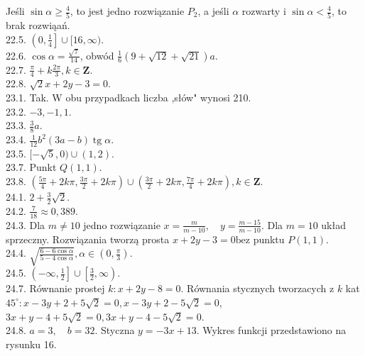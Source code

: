\documentclass[10pt]{article}
\begin{document}
Jeśli $\sin \alpha \geq \frac{4}{5}$, to jest jedno rozwiązanie $P_{2}$, a jeśli $\alpha$ rozwarty i $\sin \alpha<\frac{4}{5}$, to brak rozwiąań.\\
22.5. $\left(0, \frac{1}{4}\right] \cup[16, \infty)$.\\
22.6. $\cos \alpha=\frac{\sqrt{7}}{14}$, obwód $\frac{1}{6}(9+\sqrt{12}+\sqrt{21}) a$.\\
22.7. $\frac{\pi}{4}+k \frac{2 \pi}{3}, k \in \mathbf{Z}$.\\
22.8. $\sqrt{2} x+2 y-3=0$.\\
23.1. Tak. W obu przypadkach liczba ,słów" wynosi 210.\\
23.2. $-3,-1,1$.\\
23.3. $\frac{3}{8} a$.\\
23.4. $\frac{1}{12} b^{2}(3 a-b) \operatorname{tg} \alpha$.\\
23.5. $[-\sqrt{5}, 0) \cup(1,2)$.\\
23.7. Punkt $Q(1,1)$.\\
23.8. $\left(\frac{5 \pi}{4}+2 k \pi, \frac{3 \pi}{2}+2 k \pi\right) \cup\left(\frac{3 \pi}{2}+2 k \pi, \frac{7 \pi}{4}+2 k \pi\right), k \in \mathbf{Z}$.\\
24.1. $2+\frac{3}{2} \sqrt{2}$.\\
24.2. $\frac{7}{18} \approx 0,389$.\\
24.3. Dla $m \neq 10$ jedno rozwiązanie $x=\frac{m}{m-10}, \quad y=\frac{m-15}{m-10}$. Dla $m=10$ układ sprzeczny. Rozwiązania tworzą prosta $x+2 y-3=0 \mathrm{bez}$ punktu $P(1,1)$.\\
24.4. $\sqrt{\frac{6-6 \cos \alpha}{5-4 \cos \alpha}}, \alpha \in\left(0, \frac{\pi}{3}\right)$.\\
24.5. $\left(-\infty, \frac{1}{2}\right] \cup\left[\frac{3}{2}, \infty\right)$.\\
24.7. Równanie prostej $k: x+2 y-8=0$. Równania stycznych tworzacych z $k$ kat $45^{\circ}: x-3 y+2+5 \sqrt{2}=0, x-3 y+2-5 \sqrt{2}=0$, $3 x+y-4+5 \sqrt{2}=0,3 x+y-4-5 \sqrt{2}=0$.\\
24.8. $a=3, \quad b=32$. Styczna $y=-3 x+13$. Wykres funkcji przedstawiono na rysunku 16.\\
\end{document}
